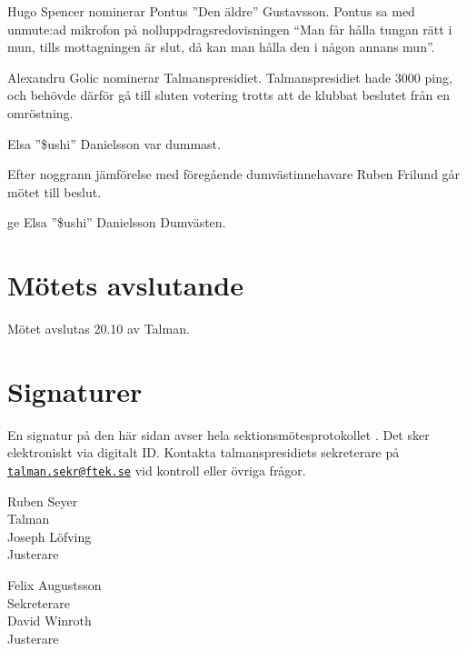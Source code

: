 \documentclass[hidelinks]{../sektionsmote} %
\begin{document}
Hugo Spencer nominerar Pontus ''Den äldre'' Gustavsson.
Pontus sa med unmute:ad mikrofon på nolluppdragsredovisningen \enquote{Man får hålla tungan rätt i mun, tills mottagningen är slut, då kan man hålla den i någon annans mun}.

Alexandru Golic nominerar Talmanspresidiet.
Talmanspresidiet hade 3000 ping, och behövde därför gå till sluten votering trotts att de klubbat beslutet från en omröstning.

\begin{beslut}
    \item Elsa ''\$ushi'' Danielsson var dummast.
\end{beslut}
Efter noggrann jämförelse med föregående dumvästinnehavare Ruben Frilund går mötet till beslut.
\begin{beslut}
    \item ge Elsa ''\$ushi'' Danielsson Dumvästen.
\end{beslut}


\section{Mötets avslutande}
Mötet avslutas 20.10 av Talman.

\clearpage
\section*{Signaturer}
En signatur på den här sidan avser hela sektionsmötesprotokollet \themote. Det sker elektroniskt via digitalt ID. Kontakta talmanspresidiets sekreterare på \href{mailto:talman.sekr@ftek.se}{\texttt{talman.sekr@ftek.se}} vid kontroll eller övriga frågor. 

\vspace{4cm}

\begin{minipage}{0.45\textwidth}
    \begin{center}
        \footnotesize Ruben Seyer\\ %
        Talman\\[3cm]
        \footnotesize Joseph Löfving\\ %
        Justerare
        \end{center}
        \end{minipage}
        \begin{minipage}{0.45\textwidth}
        \begin{center}
        \footnotesize Felix Augustsson\\ %
        Sekreterare\\[3cm]
        \footnotesize David Winroth\\ %
        Justerare
    \end{center}
\end{minipage}
\end{document}
